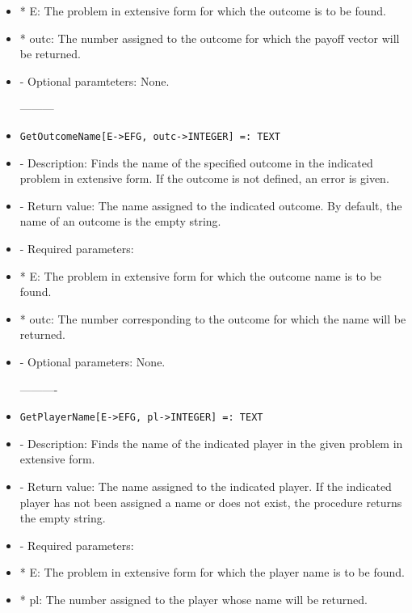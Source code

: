 \begin{itemize}
\bd
\item
*  E:  The problem in extensive form for which the outcome is to be found.
\item
*  outc:  The number assigned to the outcome for which the payoff 
vector will be returned.
\ed

\item
- Optional paramteters:  None.
\ed

---------
\item
\begin{verbatim}
GetOutcomeName[E->EFG, outc->INTEGER] =: TEXT
\end{verbatim}

\bd

\item
- Description:  Finds the name of the specified outcome in the indicated
problem in extensive form.  If the outcome is not defined, an error is
given.
\item
- Return value:  The name assigned to the indicated outcome.  By default,
the name of an outcome is the empty string.
\item
- Required parameters:

\bd
\item	  
*  E:  The problem in extensive form for which the outcome name is to
be found.
\item
*  outc:  The number corresponding to the outcome for which the name 
will be returned.
\ed

\item
- Optional parameters:  None.
\ed

----------

\item
\begin{verbatim}
GetPlayerName[E->EFG, pl->INTEGER] =: TEXT
\end{verbatim}

\bd
\item
- Description:  Finds the name of the indicated player in the given 
problem in extensive form.
\item
- Return value:  The name assigned to the indicated player.  If the 
indicated player has not been assigned a name or does not exist, the
procedure returns the empty string.
\item
- Required parameters:
	

\bd
\item  
*  E:  The problem in extensive form for which the player name is to
be found.
\item
*  pl:  The number assigned to the player whose name will be 
returned.
\ed


\end{itemize}
